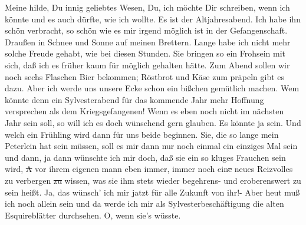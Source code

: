 \def\day{31. Dezember 1943.}
\mktitle

Meine hilde, Du innig geliebtes Wesen, Du, ich m\"{o}chte Dir schreiben, wenn ich k\"{o}nnte und es auch d\"{u}rfte, wie ich wollte.
Es ist der Altjahresabend.
Ich habe ihn sch\"{o}n verbracht, so sch\"{o}n wie es mir irgend m\"{o}glich ist in der Gefangenschaft.
Drau{\ss}en in Schnee und Sonne auf meinen Brettern.
Lange habe ich nicht mehr solche Freude gehabt, wie bei diesen Stunden.
Sie bringen so ein Frohsein mit sich, da{\ss} ich es fr\"{u}her kaum f\"{u}r m\"{o}glich gehalten h\"{a}tte.
Zum Abend sollen wir noch sechs Flaschen Bier bekommen; R\"{o}stbrot und K\"{a}se zum pr\"{a}peln gibt es dazu.
Aber ich werde uns unsere Ecke schon ein bi{\ss}chen gem\"{u}tlich machen.
Wem k\"{o}nnte denn ein Sylvesterabend f\"{u}r das kommende Jahr mehr Hoffnung versprechen als dem Kriegsgefangenen!
Wenn es eben noch nicht im n\"{a}chsten Jahr sein soll, so will ich es doch w\"{u}nschend gern glauben.
Es k\"{o}nnte ja sein.
Und welch ein Fr\"{u}hling wird dann f\"{u}r uns beide beginnen.
Sie, die so lange mein Peterlein hat sein m\"{u}ssen, soll es mir dann nur noch einmal ein einziges Mal sein und dann, ja dann w\"{u}nschte ich mir doch, da{\ss} sie ein so kluges Frauchen sein wird, \st{A} vor ihrem eigenen mann eben immer, immer noch ein\st{e} neues Reizvolles zu verbergen \st{zu} wissen, was sie ihm stets wieder begehrens- und eroberenswert zu sein hei{\ss}t.
Ja, das w\"{u}nsch' ich mir jatzt f\"{u}r alle Zukunft von ihr!-
Aber heut mu{\ss} ich noch allein sein und da werde ich mir als Sylvesterbesch\"{a}ftigung die alten Esquirebl\"{a}tter durchsehen.
O, wenn sie's w\"{u}sste.

\clearpage
